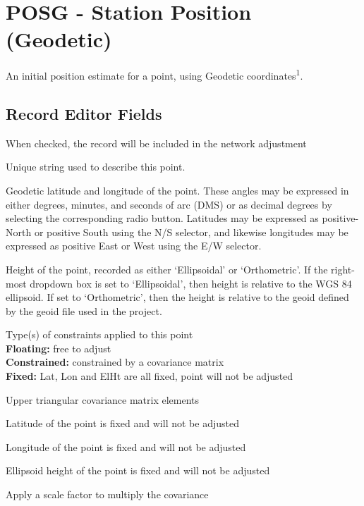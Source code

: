 \newpage
\section{POSG - Station Position (Geodetic)}

An initial position estimate for a point, using Geodetic coordinates\textsuperscript{1}.

\subsection*{Record Editor Fields}

\begin{description}[leftmargin=!,labelwidth=\widthof{\bfseries Covariance3:}]
\item[Enabled:] When checked, the record will be included in the network adjustment
\item[Label:] Unique string used to describe this point. 
\item[Latitude, Longitude:] Geodetic latitude and longitude of the point.  These angles may be expressed in either degrees, minutes, and seconds of arc (DMS) or as decimal degrees by selecting the corresponding radio button.  Latitudes may be expressed as positive-North or positive South using the N/S selector, and likewise longitudes may be expressed as positive East or West using the E/W selector.
\item[Height:] Height of the point, recorded as either `Ellipsoidal' or `Orthometric'. If the right-most dropdown box is set to `Ellipsoidal', then height is relative to the WGS 84 ellipsoid. If set to `Orthometric', then the height is relative to the geoid defined by the geoid file used in the project.
\item[Type\textsuperscript{2}:] Type(s) of constraints applied to this point \\
  \textbf{Floating:} free to adjust \\
  \textbf{Constrained:} constrained by a covariance matrix \\
  \textbf{Fixed:} Lat, Lon and ElHt are all fixed, point will not be adjusted
\item[Covariance\textsuperscript{3}:] Upper triangular covariance matrix elements
\item[Lat Fixed:] Latitude of the point is fixed and will not be adjusted
\item[Lon Fixed:] Longitude of the point is fixed and will not be adjusted
\item[ElHt Fixed:] Ellipsoid height of the point is fixed and will not be adjusted
\item[Scaling:] Apply a scale factor to multiply the covariance 
\end{description}

